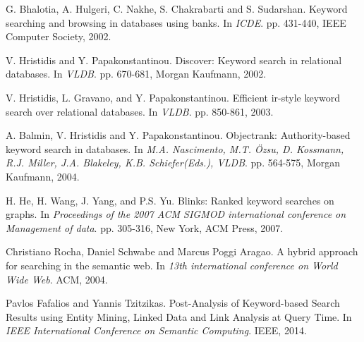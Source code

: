 \documentclass{article}
\begin{document}
\begin{thebibliography}{100}
        G. Bhalotia, A. Hulgeri, C. Nakhe, S. Chakrabarti and S. Sudarshan.
        Keyword searching and browsing in databases using banks.
        In \emph{ICDE}.
        pp. 431-440,
        IEEE Computer Society, 2002.

        V. Hristidis and Y. Papakonstantinou.
        Discover: Keyword search in relational databases.
        In \emph{VLDB}.         pp. 670-681,
        Morgan Kaufmann, 2002.

        V. Hristidis, L. Gravano, and Y. Papakonstantinou.
        Efficient ir-style keyword search over relational databases.
        In \emph{VLDB}.
        pp. 850-861, 2003.

        A. Balmin, V. Hristidis and Y. Papakonstantinou.
        Objectrank: Authority-based keyword search in databases.
        In \emph{M.A. Nascimento, M.T. \"{O}zsu, D. Kossmann, R.J. Miller, J.A. Blakeley, K.B. Schiefer(Eds.), VLDB}.
        pp. 564-575,
        Morgan Kaufmann, 2004.

        H. He, H. Wang, J. Yang, and P.S. Yu.
        Blinks: Ranked keyword searches on graphs.
        In \emph{Proceedings of the 2007 ACM SIGMOD international conference on Management of data}.
        pp. 305-316,
        New York,
        ACM Press, 2007.

        Christiano Rocha, Daniel Schwabe and Marcus Poggi Aragao.
        A hybrid approach for searching in the semantic web.
        In \emph{13th international conference on World Wide Web}.
        ACM, 2004.

        Pavlos Fafalios and Yannis Tzitzikas.
        Post-Analysis of Keyword-based Search Results using Entity Mining, Linked Data and Link Analysis at Query Time.
        In \emph{IEEE International Conference on Semantic Computing}.
        IEEE, 2014.

    \end{thebibliography}
\end{document}
